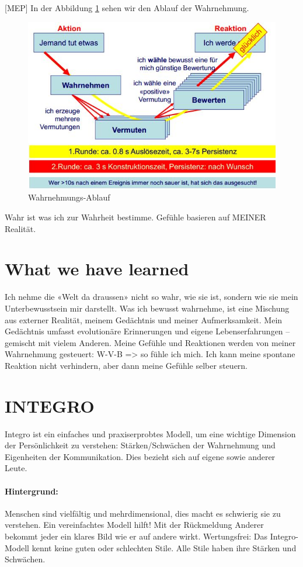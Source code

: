 [MEP] In der Abbildung \ref{fig:wahrnehmung-ablauf} sehen wir den Ablauf der Wahrnehmung.

\begin{figure}[h!]
\centering
\includegraphics[width=0.7\linewidth]{fig/wahrnehmung-ablauf}
\caption{Wahrnehmungs-Ablauf}
\label{fig:wahrnehmung-ablauf}
\end{figure}

Wahr ist was ich zur Wahrheit bestimme. Gefühle basieren auf MEINER Realität.

\section{What we have learned}
Ich nehme die «Welt da draussen» nicht so wahr, wie sie ist, sondern wie sie mein Unterbewusstsein mir darstellt. Was ich bewusst wahrnehme, ist eine Mischung aus externer Realität, meinem Gedächtnis und meiner
Aufmerksamkeit. Mein Gedächtnis umfasst evolutionäre Erinnerungen und
eigene Lebenserfahrungen – gemischt mit vielem Anderen. Meine Gefühle und Reaktionen werden von meiner Wahrnehmung gesteuert: W-V-B => so fühle ich mich. Ich kann meine spontane Reaktion nicht verhindern, aber dann meine Gefühle selber steuern.

\section{INTEGRO}
Integro ist ein einfaches und praxiserprobtes Modell, um eine wichtige Dimension der Persönlichkeit zu verstehen: Stärken/Schwächen der Wahrnehmung und Eigenheiten der Kommunikation. Dies bezieht sich auf eigene sowie anderer Leute.

\paragraph{Hintergrund:} Menschen sind vielfältig und mehrdimensional, dies macht es schwierig sie zu verstehen. Ein vereinfachtes Modell hilft! Mit der Rückmeldung Anderer bekommt jeder ein klares Bild wie er auf andere wirkt. Wertungsfrei: Das Integro-Modell kennt keine guten oder schlechten Stile. Alle Stile haben ihre Stärken und Schwächen.

